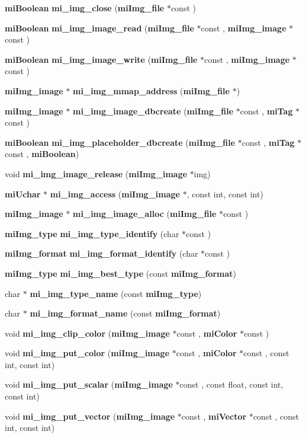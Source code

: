 \begin{CompactItemize}
{\bf mi\-Boolean} {\bf mi\_\-img\_\-close} ({\bf mi\-Img\_\-file} $\ast$const )
\item 
{\bf mi\-Boolean} {\bf mi\_\-img\_\-image\_\-read} ({\bf mi\-Img\_\-file} $\ast$const , {\bf mi\-Img\_\-image} $\ast$const )
\item 
{\bf mi\-Boolean} {\bf mi\_\-img\_\-image\_\-write} ({\bf mi\-Img\_\-file} $\ast$const , {\bf mi\-Img\_\-image} $\ast$const )
\item 
{\bf mi\-Img\_\-image} $\ast$ {\bf mi\_\-img\_\-mmap\_\-address} ({\bf mi\-Img\_\-file} $\ast$)
\item 
{\bf mi\-Img\_\-image} $\ast$ {\bf mi\_\-img\_\-image\_\-dbcreate} ({\bf mi\-Img\_\-file} $\ast$const , {\bf mi\-Tag} $\ast$const )
\item 
{\bf mi\-Boolean} {\bf mi\_\-img\_\-placeholder\_\-dbcreate} ({\bf mi\-Img\_\-file} $\ast$const , {\bf mi\-Tag} $\ast$const , {\bf mi\-Boolean})
\item 
void {\bf mi\_\-img\_\-image\_\-release} ({\bf mi\-Img\_\-image} $\ast$img)
\item 
{\bf mi\-Uchar} $\ast$ {\bf mi\_\-img\_\-access} ({\bf mi\-Img\_\-image} $\ast$, const int, const int)
\item 
{\bf mi\-Img\_\-image} $\ast$ {\bf mi\_\-img\_\-image\_\-alloc} ({\bf mi\-Img\_\-file} $\ast$const )
\item 
{\bf mi\-Img\_\-type} {\bf mi\_\-img\_\-type\_\-identify} (char $\ast$const )
\item 
{\bf mi\-Img\_\-format} {\bf mi\_\-img\_\-format\_\-identify} (char $\ast$const )
\item 
{\bf mi\-Img\_\-type} {\bf mi\_\-img\_\-best\_\-type} (const {\bf mi\-Img\_\-format})
\item 
char $\ast$ {\bf mi\_\-img\_\-type\_\-name} (const {\bf mi\-Img\_\-type})
\item 
char $\ast$ {\bf mi\_\-img\_\-format\_\-name} (const {\bf mi\-Img\_\-format})
\item 
void {\bf mi\_\-img\_\-clip\_\-color} ({\bf mi\-Img\_\-image} $\ast$const , {\bf mi\-Color} $\ast$const )
\item 
void {\bf mi\_\-img\_\-put\_\-color} ({\bf mi\-Img\_\-image} $\ast$const , {\bf mi\-Color} $\ast$const , const int, const int)
\item 
void {\bf mi\_\-img\_\-put\_\-scalar} ({\bf mi\-Img\_\-image} $\ast$const , const float, const int, const int)
\item 
void {\bf mi\_\-img\_\-put\_\-vector} ({\bf mi\-Img\_\-image} $\ast$const , {\bf mi\-Vector} $\ast$const , const int, const int)

\end{CompactItemize}
